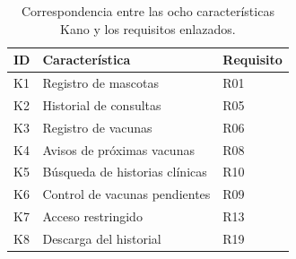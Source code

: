 \begin{table}[H]
\centering
\footnotesize
\caption{Correspondencia entre las ocho características Kano y los requisitos enlazados.}
\label{tab:kano}
\begin{tabular}{@{}lll@{}}
\toprule
ID & Característica & Requisito \\
\midrule
K1 & Registro de mascotas & R01 \\
K2 & Historial de consultas & R05 \\
K3 & Registro de vacunas & R06 \\
K4 & Avisos de próximas vacunas & R08 \\
K5 & Búsqueda de historias clínicas & R10 \\
K6 & Control de vacunas pendientes & R09 \\
K7 & Acceso restringido & R13 \\
K8 & Descarga del historial & R19 \\
\bottomrule
\end{tabular}
\end{table}
